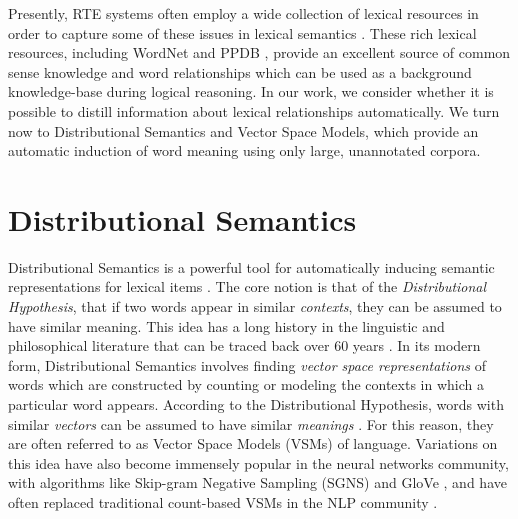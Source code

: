 Presently, RTE systems often employ a wide collection of lexical resources in
order to capture some of these issues in lexical semantics
\cite{maccartney:2008:coling,bjerva:2014:semeval,beltagy:2016:cl}. These
rich lexical resources, including WordNet \cite{miller:1995:acm} and PPDB
\cite{ganitkevitch:2013:naacl}, provide an excellent
source of common sense knowledge and word relationships which can be used as a
background knowledge-base during logical reasoning. In our work, we consider
whether it is possible to distill information about lexical relationships
automatically.  We turn now to Distributional Semantics and Vector Space
Models, which provide an automatic induction of word meaning using only large,
unannotated corpora.

\section{Distributional Semantics}
\label{sec:dist}

Distributional Semantics is a powerful tool for automatically inducing semantic
representations for lexical items \cite{turney:2010:jair,erk:2012:llc}.  The
core notion is that of the {\em Distributional Hypothesis}, that if two words
appear in similar {\em contexts}, they can be assumed to have similar meaning.
This idea has a long history in the linguistic and philosophical literature that
can be traced back over 60 years
\cite{wittgenstein:1953:pi,harris:1954:word,firth:1957:la}. In its modern form,
Distributional Semantics involves finding {\em vector space representations} of
words which are constructed by counting or modeling the contexts in which a
particular word appears. According to the Distributional Hypothesis, words
with similar {\em vectors} can be assumed to have similar {\em meanings}
\cite{turney:2010:jair}. For this reason, they are often referred to as
Vector Space Models (VSMs) of language. Variations on this idea have also
become immensely popular in the neural networks community, with algorithms
like Skip-gram Negative Sampling (SGNS) \cite{mikolov:2013:iclr} and GloVe
\cite{pennington:2014:emnlp}, and have often replaced traditional count-based
VSMs in the NLP community \cite{baroni:2014:acl}.

